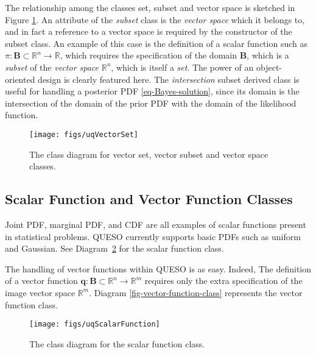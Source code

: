 The relationship among the classes set, subset and vector space is sketched in Figure \ref{fig-vector-space-subset-classes}.
%
An attribute of the {\it subset} class is the {\it vector space} which it belongs to, and in fact a reference to a vector space is required by the constructor of the subset class. An example of this case is the definition of a scalar function such as $\pi:\mathbf{B}\subset\mathbb{R}^n\rightarrow\mathbb{R}$, which requires the specification of the domain $\mathbf{B}$, which is a {\it subset} of the {\it vector space} $\mathbb{R}^n$, which is itself a {\it set}.
The power of an object-oriented design is clearly featured here.
The {\it intersection} subset derived class is useful for handling a posterior PDF \eqref{eq-Bayes-solution},
since its domain is the intersection of the domain of the prior PDF with the domain of the likelihood function.

\begin{figure}[hp]
\centering
\texttt{[image: figs/uqVectorSet]}
\vspace*{-8pt}
\caption{The class diagram for vector set, vector subset and vector space classes.}
\label{fig-vector-space-subset-classes}
\end{figure}

\subsection{Scalar Function and Vector Function Classes}\label{sec:scalar-vector-function}

Joint PDF, marginal PDF, and CDF are all examples of scalar functions present in statistical problems. 
QUESO currently supports basic PDFs such as uniform and Gaussian.
See Diagram~\ref{fig-scalar-function-class} for the scalar function class.

The handling of vector functions within QUESO is as easy. Indeed,
The definition of a vector function $\mathbf{q}:\mathbf{B}\subset\mathbb{R}^n\rightarrow\mathbb{R}^m$ requires only the extra specification of the image vector space $\mathbb{R}^m$. Diagram \ref{fig-vector-function-class} represents the vector function class.
\begin{figure}[h!]
\centering
\texttt{[image: figs/uqScalarFunction]}
\vspace{-8pt}
\caption{The class diagram for the scalar function class.}
\label{fig-scalar-function-class}
\end{figure}

